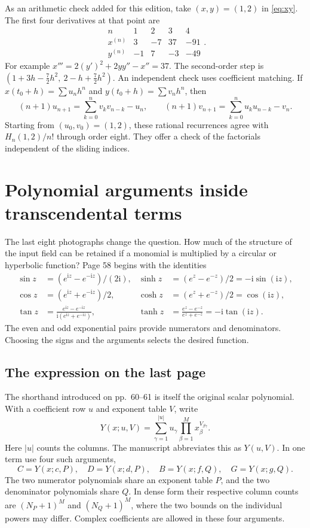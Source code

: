 \documentclass[11pt,letterpaper]{article}
\newcommand{\ii}{\mathrm{i}}
\newcommand{\src}[1]{\par\smallskip\noindent{\small\itshape Notebook, #1.}\par\medskip}
\begin{document}
As an arithmetic check added for this edition, take \((x,y)=(1,2)\) in
\eqref{eq:xy}. The first four derivatives at that point are
\[
 \begin{array}{c|rrrr}
    n&1&2&3&4\\ \hline
    x^{(n)}&3&-7&37&-91\\
    y^{(n)}&-1&7&-3&-49
 \end{array}.
\]
For example \(x'''=2(y')^2+2yy''-x''=37\).
The second-order step is
\((1+3h-\tfrac72h^2,\ 2-h+\tfrac72h^2)\).
An independent check uses coefficient matching. If
\(x(t_0+h)=\sum u_n h^n\) and \(y(t_0+h)=\sum v_n h^n\), then
\[
 (n+1)u_{n+1}=\sum_{k=0}^n v_kv_{n-k}-u_n,\qquad
 (n+1)v_{n+1}=\sum_{k=0}^n u_ku_{n-k}-v_n.
\]
Starting from \((u_0,v_0)=(1,2)\), these rational recurrences agree with
\(H_n(1,2)/n!\) through order eight. They offer a check of the factorials
independent of the sliding indices.
\src{pp.~7--9, 50--57}

\clearpage
\section{Polynomial arguments inside transcendental terms}\label{sec:trans}
The last eight photographs change the question. How much of the structure
of the input field can be retained if a monomial is multiplied by a circular
or hyperbolic function? Page 58 begins with the identities
\begin{align*}
 \sin z&=(e^{\ii z}-e^{-\ii z})/(2\ii),  &
 \sinh z&=(e^z-e^{-z})/2=-\ii\sin(\ii z),\\
 \cos z&=(e^{\ii z}+e^{-\ii z})/2, &
 \cosh z&=(e^z+e^{-z})/2=\cos(\ii z),\\
 \tan z&=\frac{e^{\ii z}-e^{-\ii z}}{\ii(e^{\ii z}+e^{-\ii z})}, &
 \tanh z&=\frac{e^z-e^{-z}}{e^z+e^{-z}}=-\ii\tan(\ii z).
\end{align*}
The even and odd exponential pairs provide numerators and denominators.
Choosing the signs and the arguments selects the desired function.

\subsection{The expression on the last page}
The shorthand introduced on pp.~60--61 is itself the original scalar
polynomial. With a coefficient row \(u\) and exponent table \(V\), write
\begin{equation}\label{eq:Y}
 Y(x;u,V)=\sum_{\gamma=1}^{|u|}u_\gamma
                  \prod_{\beta=1}^M x_\beta^{V_{\beta\gamma}}.
\end{equation}
Here \(|u|\) counts the columns. The manuscript abbreviates this as
\(Y(u,V)\). In one term use four such arguments,
\[
 C=Y(x;c,P),\quad D=Y(x;d,P),\quad
 B=Y(x;f,Q),\quad G=Y(x;g,Q).
\]
The two numerator polynomials share an exponent table \(P\), and the two
denominator polynomials share \(Q\). In dense form their respective column
counts are \((N_P+1)^M\) and \((N_Q+1)^M\), where the two bounds on the
individual powers may differ. Complex coefficients are allowed in these four arguments.
\end{document}
